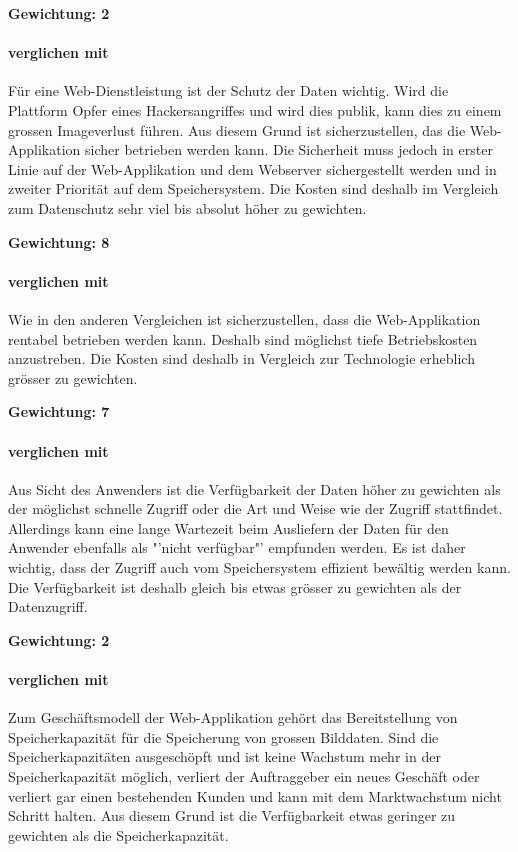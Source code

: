 \textbf{Gewichtung: 2}

\paragraph*{ verglichen mit }
Für eine Web-Dienstleistung ist der Schutz der Daten wichtig. Wird die Plattform Opfer eines Hackersangriffes und wird dies publik, kann dies zu einem grossen Imageverlust führen. Aus diesem Grund ist sicherzustellen, das die Web-Applikation sicher betrieben werden kann. Die Sicherheit muss jedoch in erster Linie auf der Web-Applikation und dem Webserver sichergestellt werden und in zweiter Priorität auf dem Speichersystem. Die Kosten sind deshalb im Vergleich zum Datenschutz sehr viel bis absolut höher zu gewichten.

\textbf{Gewichtung: 8}

\paragraph*{ verglichen mit }
Wie in den anderen Vergleichen ist sicherzustellen, dass die Web-Applikation rentabel betrieben werden kann. Deshalb sind möglichst tiefe Betriebskosten anzustreben. Die Kosten sind deshalb in Vergleich zur Technologie erheblich grösser zu gewichten.

\textbf{Gewichtung: 7}

\paragraph*{ verglichen mit }
Aus Sicht des Anwenders ist die Verfügbarkeit der Daten höher zu gewichten als der möglichst schnelle Zugriff oder die Art und Weise wie der Zugriff stattfindet. Allerdings kann eine lange Wartezeit beim Ausliefern der Daten für den Anwender ebenfalls als "'nicht verfügbar"' empfunden werden. Es ist daher wichtig, dass der Zugriff auch vom Speichersystem effizient bewältig werden kann. Die Verfügbarkeit ist deshalb gleich bis etwas grösser zu gewichten als der Datenzugriff.

\textbf{Gewichtung: 2}

\paragraph*{ verglichen mit }
Zum Geschäftsmodell der Web-Applikation gehört das Bereitstellung von Speicherkapazität für die Speicherung von grossen Bilddaten. Sind die Speicherkapazitäten ausgeschöpft und ist keine Wachstum mehr in der Speicherkapazität möglich, verliert der Auftraggeber ein neues Geschäft oder verliert gar einen bestehenden Kunden und kann mit dem Marktwachstum nicht Schritt halten. Aus diesem Grund ist die Verfügbarkeit etwas geringer zu gewichten als die Speicherkapazität.

